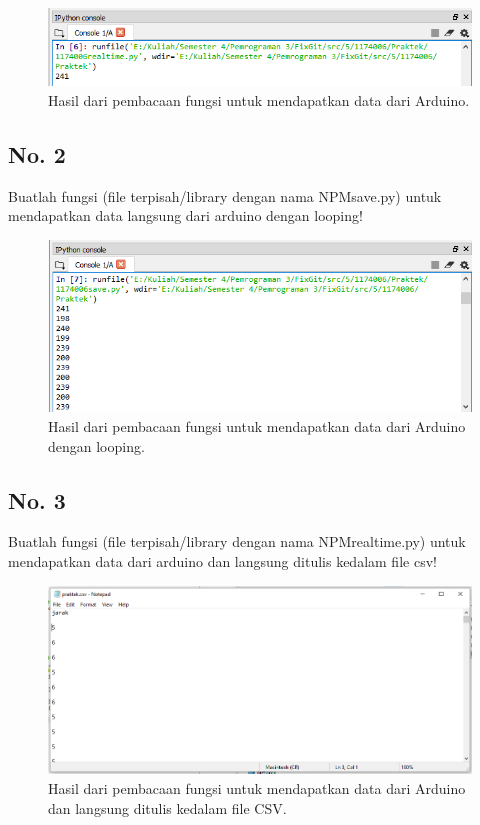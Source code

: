 \begin{figure}[H]
	\includegraphics[width=12cm]{figures/5/1174086/Praktek/1.png}
	\centering
	\caption{Hasil dari pembacaan fungsi untuk mendapatkan data dari Arduino.}
\end{figure}

\subsection{ No. 2}
Buatlah fungsi (file terpisah/library dengan nama NPMsave.py) untuk mendapatkan data langsung dari arduino dengan looping!


\begin{figure}[H]
	\includegraphics[width=12cm]{figures/5/1174086/Praktek/2.png}
	\centering
	\caption{Hasil dari pembacaan fungsi untuk mendapatkan data dari Arduino dengan looping.}
\end{figure}

\subsection{ No. 3}
Buatlah  fungsi  (file  terpisah/library  dengan  nama  NPMrealtime.py) untuk mendapatkan data dari arduino dan langsung ditulis kedalam file csv!


\begin{figure}[H]
	\includegraphics[width=12cm]{figures/5/1174086/Praktek/3.png}
	\centering
	\caption{Hasil dari pembacaan fungsi untuk mendapatkan data dari Arduino dan langsung ditulis kedalam file CSV.}
\end{figure}


